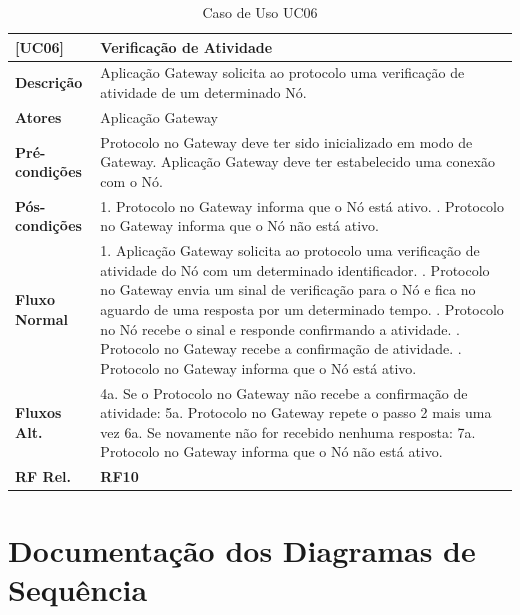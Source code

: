 \begin{longtable}{|p{2.65cm}|p{13cm}|}
    \caption{Caso de Uso UC06}\label{tab:use-cases06} \\
    \hline
    \textbf{[UC06]} & Verificação de Atividade \\
    \hline
    \textbf{Descrição} & Aplicação Gateway solicita ao protocolo uma verificação de atividade de um determinado Nó. \\
    \hline
    \textbf{Atores} & Aplicação Gateway \\
    \hline
    \textbf{Pré-condições} & Protocolo no Gateway deve ter sido inicializado em modo de Gateway. \newline
    Aplicação Gateway deve ter estabelecido uma conexão com o Nó. \\
    \hline
    \textbf{Pós-condições} & 1. Protocolo no Gateway informa que o Nó está ativo. \newline
    2. Protocolo no Gateway informa que o Nó não está ativo. \\
    \hline
    \textbf{Fluxo Normal} & 1. Aplicação Gateway solicita ao protocolo uma verificação de atividade do Nó com um determinado identificador. \newline
    2. Protocolo no Gateway envia um sinal de verificação para o Nó e fica no aguardo de uma resposta por um determinado tempo. \newline
    3. Protocolo no Nó recebe o sinal e responde confirmando a atividade. \newline
    4. Protocolo no Gateway recebe a confirmação de atividade. \newline
    5. Protocolo no Gateway informa que o Nó está ativo. \\
    \hline
    \textbf{Fluxos Alt.} & 4a. Se o Protocolo no Gateway não recebe a confirmação de atividade: \newline
    5a. Protocolo no Gateway repete o passo 2 mais uma vez \newline
    6a. Se novamente não for recebido nenhuma resposta: \newline
    7a. Protocolo no Gateway informa que o Nó não está ativo. \\
    \hline
    \textbf{RF Rel.} & \textbf{RF10} \\
    \hline
\end{longtable}

\section{Documentação dos Diagramas de Sequência}


